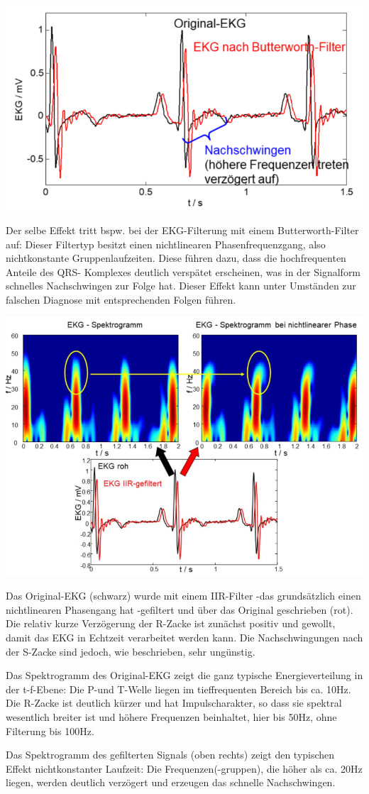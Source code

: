 \documentclass[a4paper]{article}
\begin{document}
\begin{multicols}{3}
  \begin{itemize*}
    \item \includegraphics[width=.5\linewidth]{Assets/Biosignalverarbeitung-ekg-verzerrt.png}
    \item Der selbe Effekt tritt bspw. bei der EKG-Filterung mit einem Butterworth-Filter auf: Dieser Filtertyp besitzt einen nichtlinearen Phasenfrequenzgang, also nichtkonstante Gruppenlaufzeiten. Diese führen dazu, dass die hochfrequenten Anteile des QRS- Komplexes deutlich verspätet erscheinen, was in der Signalform schnelles Nachschwingen zur Folge hat. Dieser Effekt kann unter Umständen zur falschen Diagnose mit entsprechenden Folgen führen.
    \item \includegraphics[width=.5\linewidth]{Assets/Biosignalverarbeitung-ekg-verzerrt2.png}
    \item Das Original-EKG (schwarz) wurde mit einem IIR-Filter -das grundsätzlich einen nichtlinearen Phasengang hat -gefiltert und über das Original geschrieben (rot). Die relativ kurze Verzögerung der R-Zacke ist zunächst positiv und gewollt, damit das EKG in Echtzeit verarbeitet werden kann. Die Nachschwingungen nach der S-Zacke sind jedoch, wie beschrieben, sehr ungünstig.
    \item Das Spektrogramm des Original-EKG zeigt die ganz typische Energieverteilung in der t-f-Ebene: Die P-und T-Welle liegen im tieffrequenten Bereich bis ca. 10Hz. Die R-Zacke ist deutlich kürzer und hat Impulscharakter, so dass sie spektral wesentlich breiter ist und höhere Frequenzen beinhaltet, hier bis 50Hz, ohne Filterung bis 100Hz.
    \item Das Spektrogramm des gefilterten Signals (oben rechts) zeigt den typischen Effekt nichtkonstanter Laufzeit: Die Frequenzen(-gruppen), die höher als ca. 20Hz liegen, werden deutlich verzögert und erzeugen das schnelle Nachschwingen.
  \end{itemize*}


\end{multicols}
\end{document}
